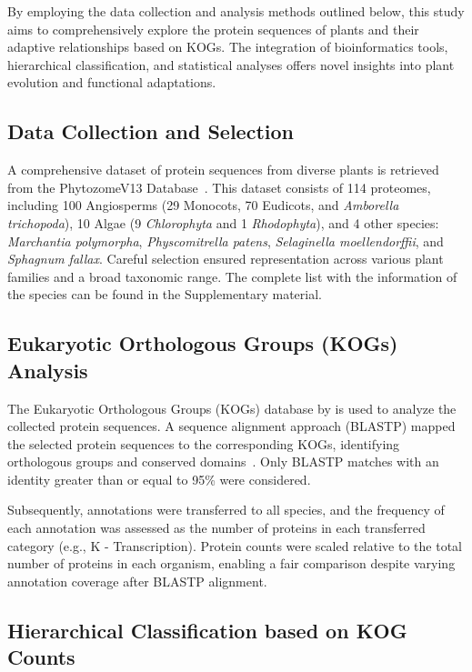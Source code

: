 By employing the data collection and analysis methods outlined 
below, this study aims to comprehensively explore the protein 
sequences of plants and their adaptive relationships based 
on KOGs. The integration of bioinformatics tools, hierarchical 
classification, and statistical analyses offers novel insights 
into plant evolution and functional adaptations.


\subsection{Data Collection and Selection}
\label{sec:method.data}

A comprehensive dataset of protein sequences from diverse plants 
is retrieved from the PhytozomeV13 Database~\citep{goodstein2011}.
This dataset consists of 114 proteomes, including 100 
Angiosperms (29 Monocots, 70 Eudicots, and \emph{Amborella 
trichopoda}), 10 Algae (9 \emph{Chlorophyta} and 1 
\emph{Rhodophyta}), and 4 other species: \emph{Marchantia 
polymorpha}, \emph{Physcomitrella patens}, \emph{Selaginella 
moellendorffii}, and \emph{Sphagnum fallax}. Careful selection 
ensured representation across various plant families and a 
broad taxonomic range. The complete list with the information 
of the species can be found in the Supplementary material.


\subsection{Eukaryotic Orthologous Groups (KOGs) Analysis}
\label{sec:method.kog}

The Eukaryotic Orthologous Groups (KOGs) database by 
\cite{tatusov2003} is used to analyze the collected protein 
sequences. A sequence alignment approach (BLASTP) mapped the 
selected protein sequences to the corresponding KOGs, 
identifying orthologous groups and conserved 
domains~\citep{camacho2009}. Only BLASTP matches with an 
identity greater than or equal to 95\% were considered.

Subsequently, annotations were transferred to all species, 
and the frequency of each annotation was assessed as the 
number of proteins in each transferred category (e.g., K - 
Transcription). Protein counts were scaled relative to the 
total number of proteins in each organism, enabling a 
fair comparison despite varying annotation coverage after 
BLASTP alignment.


\subsection{Hierarchical Classification based on KOG Counts}
\label{sec:method.hierarchy}

